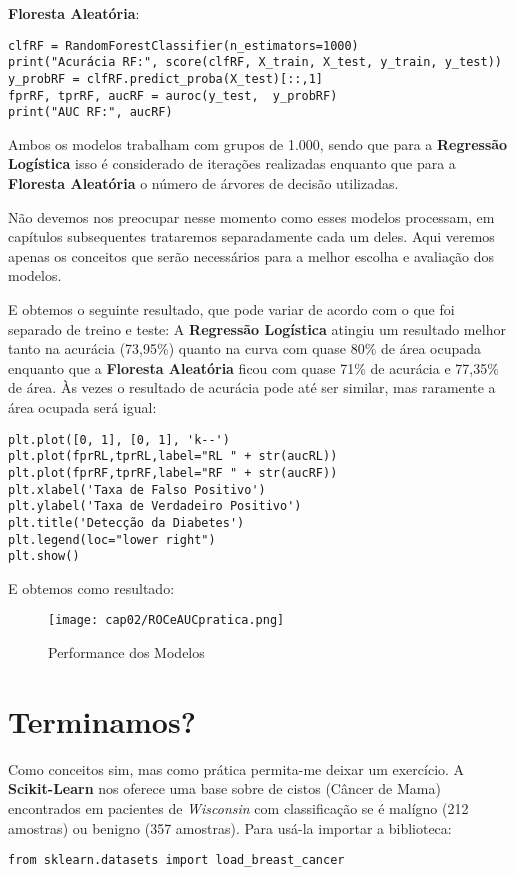 \textbf{Floresta Aleatória}:
\begin{lstlisting}
clfRF = RandomForestClassifier(n_estimators=1000)
print("Acurácia RF:", score(clfRF, X_train, X_test, y_train, y_test))
y_probRF = clfRF.predict_proba(X_test)[::,1]
fprRF, tprRF, aucRF = auroc(y_test,  y_probRF)
print("AUC RF:", aucRF)
\end{lstlisting}

Ambos os modelos trabalham com grupos de 1.000, sendo que para a \textbf{Regressão Logística} isso é considerado de iterações realizadas enquanto que para a \textbf{Floresta Aleatória} o número de árvores de decisão utilizadas. 

\begin{note} 
	Não devemos nos preocupar nesse momento como esses modelos processam, em capítulos subsequentes trataremos separadamente cada um deles. Aqui veremos apenas os conceitos que serão necessários para a melhor escolha e avaliação dos modelos.
\end{note}

E obtemos o seguinte resultado, que pode variar de acordo com o que foi separado de treino e teste: A \textbf{Regressão Logística} atingiu um resultado melhor tanto na acurácia (73,95\%) quanto na curva com quase 80\% de área ocupada enquanto que a \textbf{Floresta Aleatória} ficou com quase 71\% de acurácia e 77,35\% de área. Às vezes o resultado de acurácia pode até ser similar, mas raramente a área ocupada será igual:
\begin{lstlisting}
plt.plot([0, 1], [0, 1], 'k--')
plt.plot(fprRL,tprRL,label="RL " + str(aucRL))
plt.plot(fprRF,tprRF,label="RF " + str(aucRF))
plt.xlabel('Taxa de Falso Positivo')
plt.ylabel('Taxa de Verdadeiro Positivo')
plt.title('Detecção da Diabetes')
plt.legend(loc="lower right")
plt.show()
\end{lstlisting}

E obtemos como resultado:
\begin{figure}[H]
	\centering
	\texttt{[image: cap02/ROCeAUCpratica.png]}
	\caption{Performance dos Modelos}
\end{figure}

\section{Terminamos?}
Como conceitos sim, mas como prática permita-me deixar um exercício. A \textbf{Scikit-Learn} nos oferece uma base sobre de cistos (Câncer de Mama) encontrados em pacientes de \textit{Wisconsin} com classificação se é malígno (212 amostras) ou benigno (357 amostras). Para usá-la importar a biblioteca:
\begin{lstlisting}
from sklearn.datasets import load_breast_cancer
\end{lstlisting}

